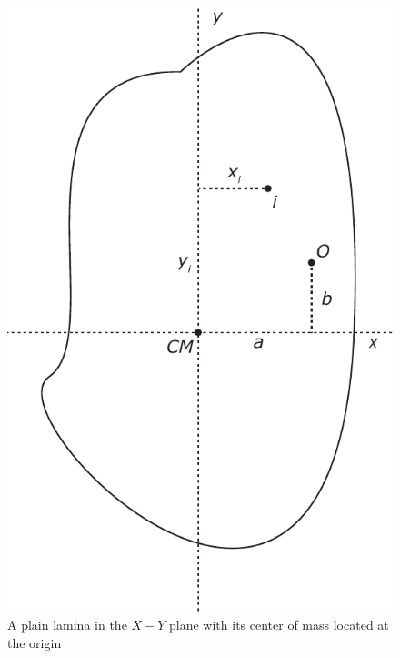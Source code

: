 \begin{figure}[H]
  \centering
  \includegraphics[width=0.25\linewidth]{fig/images/parallel_axis_lamina.pdf}
  \caption{A plain lamina in the $X-Y$ plane with its center of mass located at the origin}
  \label{fig:parallel_axis_lamina}
\end{figure}